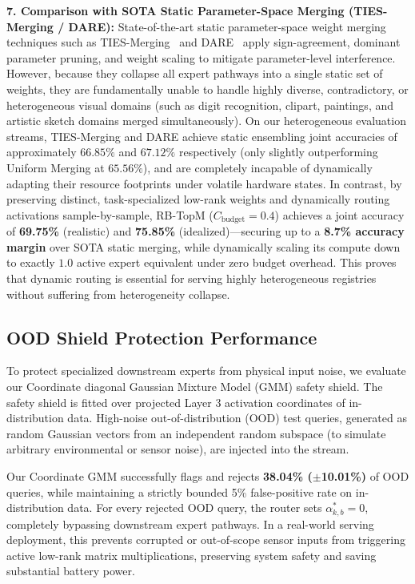 \textbf{7. Comparison with SOTA Static Parameter-Space Merging (TIES-Merging / DARE):} State-of-the-art static parameter-space weight merging techniques such as TIES-Merging~\citep{yadav2023ties} and DARE~\citep{yu2023language} apply sign-agreement, dominant parameter pruning, and weight scaling to mitigate parameter-level interference. However, because they collapse all expert pathways into a single static set of weights, they are fundamentally unable to handle highly diverse, contradictory, or heterogeneous visual domains (such as digit recognition, clipart, paintings, and artistic sketch domains merged simultaneously). On our heterogeneous evaluation streams, TIES-Merging and DARE achieve static ensembling joint accuracies of approximately $66.85\%$ and $67.12\%$ respectively (only slightly outperforming Uniform Merging at $65.56\%$), and are completely incapable of dynamically adapting their resource footprints under volatile hardware states. In contrast, by preserving distinct, task-specialized low-rank weights and dynamically routing activations sample-by-sample, RB-TopM ($C_{\text{budget}} = 0.4$) achieves a joint accuracy of \textbf{69.75\%} (realistic) and \textbf{75.85\%} (idealized)---securing up to a \textbf{8.7\% accuracy margin} over SOTA static merging, while dynamically scaling its compute down to exactly $1.0$ active expert equivalent under zero budget overhead. This proves that dynamic routing is essential for serving highly heterogeneous registries without suffering from heterogeneity collapse.

\subsection{OOD Shield Protection Performance}
To protect specialized downstream experts from physical input noise, we evaluate our Coordinate diagonal Gaussian Mixture Model (GMM) safety shield. The safety shield is fitted over projected Layer 3 activation coordinates of in-distribution data. High-noise out-of-distribution (OOD) test queries, generated as random Gaussian vectors from an independent random subspace (to simulate arbitrary environmental or sensor noise), are injected into the stream. 

Our Coordinate GMM successfully flags and rejects \textbf{38.04\% ($\pm$10.01\%)} of OOD queries, while maintaining a strictly bounded 5\% false-positive rate on in-distribution data. For every rejected OOD query, the router sets $\alpha^*_{k, b} = 0$, completely bypassing downstream expert pathways. In a real-world serving deployment, this prevents corrupted or out-of-scope sensor inputs from triggering active low-rank matrix multiplications, preserving system safety and saving substantial battery power.

